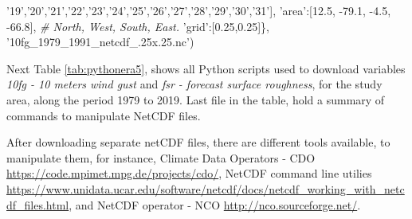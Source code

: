 \documentclass[12pt,oneside]{reedthesis}
\newenvironment{Shaded}{\begin{snugshade}}{\end{snugshade}}
\newcommand{\CommentTok}[1]{\textcolor[rgb]{0.56,0.35,0.01}{\textit{#1}}}
\newcommand{\FloatTok}[1]{\textcolor[rgb]{0.00,0.00,0.81}{#1}}
\newcommand{\NormalTok}[1]{#1}
\newcommand{\StringTok}[1]{\textcolor[rgb]{0.31,0.60,0.02}{#1}}
\begin{document}
\begin{Shaded}
\begin{Highlighting}[]
              \StringTok{'19'}\NormalTok{,}\StringTok{'20'}\NormalTok{,}\StringTok{'21'}\NormalTok{,}\StringTok{'22'}\NormalTok{,}\StringTok{'23'}\NormalTok{,}\StringTok{'24'}\NormalTok{,}\StringTok{'25'}\NormalTok{,}\StringTok{'26'}\NormalTok{,}\StringTok{'27'}\NormalTok{,}\StringTok{'28'}\NormalTok{,}\StringTok{'29'}\NormalTok{,}\StringTok{'30'}\NormalTok{,}\StringTok{'31'}\NormalTok{],}
       \StringTok{'area'}\NormalTok{:[}\FloatTok{12.5}\NormalTok{, }\FloatTok{-79.1}\NormalTok{, }\FloatTok{-4.5}\NormalTok{, }\FloatTok{-66.8}\NormalTok{], }\CommentTok{# North, West, South, East.}
       \StringTok{'grid'}\NormalTok{:[}\FloatTok{0.25}\NormalTok{,}\FloatTok{0.25}\NormalTok{]\},}
      \StringTok{'10fg_1979_1991_netcdf_.25x.25.nc'}\NormalTok{)}
\end{Highlighting}
\end{Shaded}
\normalsize

Next Table \ref{tab:pythonera5}, shows all Python scripts used to download variables \emph{10fg - 10 meters wind gust} and \emph{fsr - forecast surface roughness}, for the study area, along the period 1979 to 2019. Last file in the table, hold a summary of commands to manipulate NetCDF files.

After downloading separate netCDF files, there are different tools available, to manipulate them, for instance, Climate Data Operators - CDO \url{https://code.mpimet.mpg.de/projects/cdo/}, NetCDF command line utilies \url{https://www.unidata.ucar.edu/software/netcdf/docs/netcdf_working_with_netcdf_files.html}, and NetCDF operator - NCO \url{http://nco.sourceforge.net/}.
\end{document}
